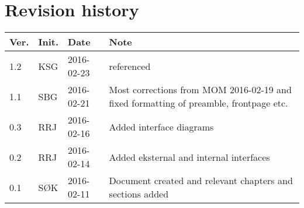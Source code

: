 \label{chp_revisionHistory}
\chapter*{Revision history}

\begin{tabular}{b{1cm} b{1cm} b{2cm} b{8cm}}
	\textbf{Ver.} & \textbf{Init.} & \textbf{Date} & \textbf{Note}\\
	\hline
	1.2 & KSG & 2016-02-23 & \aadisddd referenced \\
    1.1 & SBG & 2016-02-21 & Most corrections from MOM 2016-02-19 and fixed formatting of preamble, frontpage etc.\\
    0.3 & RRJ & 2016-02-16 & Added interface diagrams \\
    0.2 & RRJ & 2016-02-14 & Added eksternal and internal interfaces \\
    0.1 & SØK & 2016-02-11 & Document created and relevant chapters and sections added \\
\end{tabular}

